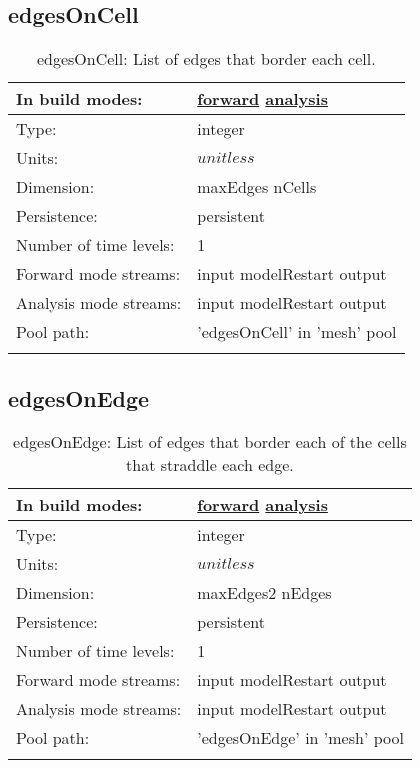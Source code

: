 \subsection[edgesOnCell]{edgesOnCell}
\label{subsec:var_sec_mesh_edgesOnCell}
\begin{center}
\begin{longtable}{| p{2.0in} | p{4.0in} |}
        \hline 
        In build modes: & \hyperref[subsec:forward_var_tab_mesh]{forward} \hyperref[subsec:analysis_var_tab_mesh]{analysis} \\
        \hline 
        Type: & integer \\
        \hline 
        Units: & $unitless$ \\
        \hline 
        Dimension: & maxEdges nCells \\
        \hline 
        Persistence: & persistent \\
        \hline 
        Number of time levels: & 1 \\
        \hline 
		 Forward mode streams: &  input modelRestart output \\
        \hline 
		 Analysis mode streams: &  input modelRestart output \\
        \hline 
            Pool path: & 'edgesOnCell' in 'mesh' pool
 \\
		 \hline 
    \caption{edgesOnCell: List of edges that border each cell.}
\end{longtable}
\end{center}
\subsection[edgesOnEdge]{edgesOnEdge}
\label{subsec:var_sec_mesh_edgesOnEdge}
\begin{center}
\begin{longtable}{| p{2.0in} | p{4.0in} |}
        \hline 
        In build modes: & \hyperref[subsec:forward_var_tab_mesh]{forward} \hyperref[subsec:analysis_var_tab_mesh]{analysis} \\
        \hline 
        Type: & integer \\
        \hline 
        Units: & $unitless$ \\
        \hline 
        Dimension: & maxEdges2 nEdges \\
        \hline 
        Persistence: & persistent \\
        \hline 
        Number of time levels: & 1 \\
        \hline 
		 Forward mode streams: &  input modelRestart output \\
        \hline 
		 Analysis mode streams: &  input modelRestart output \\
        \hline 
            Pool path: & 'edgesOnEdge' in 'mesh' pool
 \\
		 \hline 
    \caption{edgesOnEdge: List of edges that border each of the cells that straddle each edge.}
\end{longtable}
\end{center}
